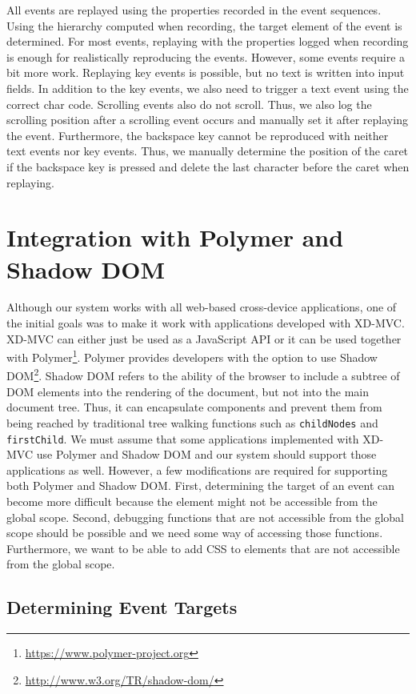 All events are replayed using the properties recorded in the event sequences. Using the hierarchy computed when recording, the target element of the event is determined. For most events, replaying with the properties logged when recording is enough for realistically reproducing the events. However, some events require a bit more work. Replaying key events is possible, but no text is written into input fields. In addition to the key events, we also need to trigger a text event using the correct char code. Scrolling events also do not scroll. Thus, we also log the scrolling position after a scrolling event occurs and manually set it after replaying the event. Furthermore, the backspace key cannot be reproduced with neither text events nor key events. Thus, we manually determine the position of the caret if the backspace key is pressed and delete the last character before the caret when replaying. 

\section{Integration with Polymer and Shadow DOM}

Although our system works with all web-based cross-device applications, one of the initial goals was to make it work with applications developed with XD-MVC. XD-MVC can either just be used as a JavaScript API or it can be used together with Polymer\footnote{\url{https://www.polymer-project.org}}. Polymer provides developers with the option to use Shadow DOM\footnote{\url{http://www.w3.org/TR/shadow-dom/}}. Shadow DOM refers to the ability of the browser to include a subtree of DOM elements into the rendering of the document, but not into the main document tree. Thus, it can encapsulate components and prevent them from being reached by traditional tree walking functions such as \lstinline|childNodes| and \lstinline|firstChild|. We must assume that some applications implemented with XD-MVC use Polymer and Shadow DOM and our system should support those applications as well. However, a few modifications are required for supporting both Polymer and Shadow DOM. First, determining the target of an event can become more difficult because the element might not be accessible from the global scope. Second, debugging functions that are not accessible from the global scope should be possible and we need some way of accessing those functions. Furthermore, we want to be able to add CSS to elements that are not accessible from the global scope.

\subsection{Determining Event Targets}

